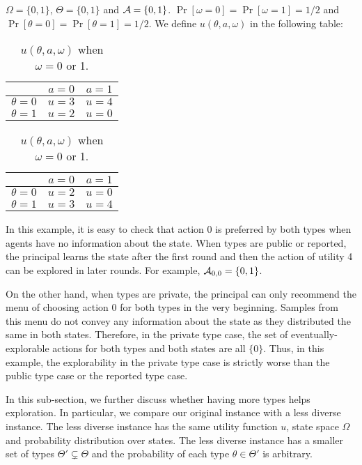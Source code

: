 \begin{example}
\label{exp:simple}
$\varOmega = \{0,1\}$, $\varTheta = \{0,1\}$ and $\mathcal{A} =\{0,1\}$. $\Pr[\omega =0] =\Pr[\omega =1] = 1/2$ and $\Pr[\theta = 0] = \Pr[\theta=1] =1/2$. We define $u(\theta, a, \omega)$ in the following table:\\
\begin{table}[H]
\centering
\begin{tabular}{|c||c|c|}
\hline
&$a=0$&$a=1$\\
\hline
\hline
$\theta = 0$& $u = 3$ & $u =4$\\
\hline
$\theta = 1$& $u = 2$ & $u =0$\\
\hline
\end{tabular}
\quad
\begin{tabular}{|c||c|c|}
\hline
&$a=0$&$a=1$\\
\hline
\hline
$\theta = 0$& $u = 2$ & $u =0$\\
\hline
$\theta = 1$& $u = 3$ & $u =4$\\
\hline
\end{tabular}
\caption{$u(\theta,a,\omega)$ when $\omega =0 $ or 1.}
\end{table}

\end{example}
In this example, it is easy to check that action 0 is preferred by both types when agents have no information about the state. When types are public or reported, the principal learns the state after the first round and then the action of utility 4 can be explored in later rounds. For example, $\mathcal{A}_{0,0} = \{0,1\}$.

On the other hand, when types are private, the principal can only recommend the menu of choosing action 0 for both types in the very beginning. Samples from this menu do not convey any information about the state as they distributed the same in both states. Therefore, in the private type case, the set of eventually-explorable actions for both types and both states are all $\{0\}$. Thus, in this example, the explorability in the private type case is strictly worse than the public type case or the reported type case.

In this sub-section, we further discuss whether having more types helps exploration. In particular, we compare our original instance with a less diverse instance. The less diverse instance has the same utility function $u$, state space $\varOmega$ and probability distribution over states. The less diverse instance has a smaller set of types $\varTheta' \subsetneq \varTheta$ and the probability of each type $\theta \in \varTheta'$ is arbitrary.

